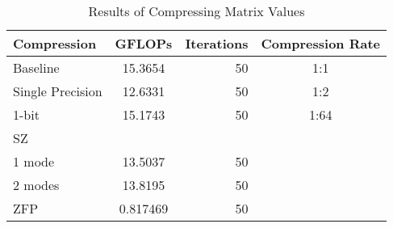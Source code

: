 \begin{table}
	\centering
	\begin{tabular}{l|S|r|c}
		Compression & GFLOPs & Iterations & Compression Rate\\
		\hline
		Baseline & 15.3654 & 50 & 1:1 \\
		Single Precision & 12.6331 & 50 & 1:2 \\
		1-bit & 15.1743 & 50 & 1:64 \\ %
		SZ & & & \\
		\hspace{3mm} 1 mode & 13.5037 & 50 & \\
		\hspace{3mm} 2 modes & 13.8195 & 50 & \\
		ZFP & 0.817469 & 50 & \\ %
	\end{tabular}
	\caption{Results of Compressing Matrix Values}
	\label{tab:results-val}
\end{table}
